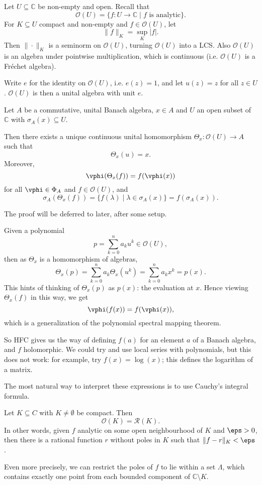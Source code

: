 \documentclass[12pt]{article}
\begin{document}
Let $U \subseteq \mathbb{C}$ be non-empty and open. Recall that
\[
	\mathcal{O}(U) = \{f : U \to \mathbb{C} \mid f \text{ is analytic}\}.
\]
For $K \subseteq U$ compact and non-empty and $f \in \mathcal{O}(U)$, let
\[
\|f\|_K = \sup_{K} |f|.
\]
Then $\|\cdot\|_K$ is a seminorm on $\mathcal{O}(U)$, turning $\mathcal{O}(U)$ into a LCS. Also $\mathcal{O}(U)$ is an algebra under pointwise multiplication, which is continuous (i.e. $\mathcal{O}(U)$ is a Fr\'echet algebra).

Write $e$ for the identity on $\mathcal{O}(U)$, i.e. $e(z) = 1$, and let $u(z) = z$ for all $z \in U$. $\mathcal{O}(U)$ is then a unital algebra with unit $e$.

\begin{theorem}
	Let $A$ be a commutative, unital Banach algebra, $x \in A$ and $U$ an open subset of $\mathbb{C}$ with $\sigma_A(x) \subseteq U$.

	Then there exists a unique continuous unital homomorphism $\Theta_x : \mathcal{O}(U) \to A$ such that
	\[
	\Theta_x(u) = x.
	\]
	Moreover,
	\[
	\vphi(\Theta_x(f)) = f(\vphi(x))
	\]
	for all $\vphi \in \Phi_A$ and $f \in \mathcal{O}(U)$, and
	\[
		\sigma_A(\Theta_x(f)) = \{f(\lambda) \mid \lambda \in \sigma_A(x)\} = f(\sigma_A(x)).
	\]
\end{theorem}

The proof will be deferred to later, after some setup.

\begin{remark}
	Given a polynomial
	\[
	p = \sum_{k = 0}^n a_k u^k \in \mathcal{O}(U),
	\]
	then as $\Theta_x$ is a homomorphism of algebras,
	\[
	\Theta_x(p) = \sum_{k = 0}^n a_k \Theta_x( u^k) = \sum_{k = 0}^n a_k x^k = p(x).
	\]
	This hints of thinking of $\Theta_x(p)$ as $p(x)$: the evaluation at $x$. Hence viewing $\Theta_x(f)$ in this way, we get
	\[
	\vphi(f(x)) = f(\vphi(x)),
	\]
	which is a generalization of the polynomial spectral mapping theorem.
\end{remark}

So HFC gives us the way of defining $f(a)$ for an element $a$ of a Banach algebra, and $f$ holomorphic. We could try and use local series with polynomials, but this does not work: for example, try $f(x) = \log(x)$; this defines the logarithm of a matrix.

The most natural way to interpret these expressions is to use Cauchy's integral formula.

\begin{theorem}
	Let $K \subseteq C$ with $K \neq \emptyset$ be compact. Then
	\[
	\mathcal{O}(K) = \mathcal{R}(K).
	\]
	In other words, given $f$ analytic on some open neighbourhood of $K$ and $\eps > 0$, then there is a rational function $r$ without poles in $K$ such that $\|f - r\|_K < \eps$.

	Even more precisely, we can restrict the poles of $f$ to lie within a set $\Lambda$, which contains exactly one point from each bounded component of $\mathbb{C} \setminus K$.
\end{theorem}
\end{document}
